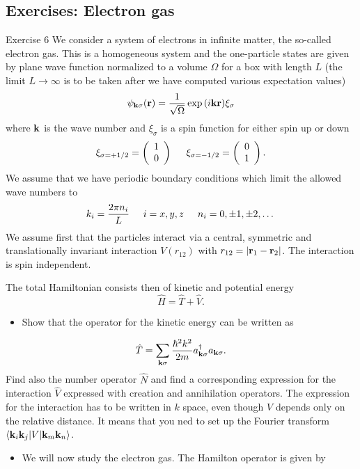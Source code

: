 \documentclass[%
twoside,                 %
final,                   %
10pt]{article}
\begin{document}
\subsection{Exercises: Electron gas}
\begin{block}{Exercise 6 }
We consider a system of electrons in infinite matter, the so-called electron gas. This is a homogeneous system and the one-particle states are given by plane wave function normalized to a volume $\Omega$ 
for a box with length $L$ (the limit $L\rightarrow \infty$ is to be taken after we have computed various expectation values)
\[
\psi_{{\bf k}\sigma}({\bf r})= \frac{1}{\sqrt{\Omega}}\exp{(i{\bf kr})}\xi_{\sigma}
\]
where ${\bf k}$ is the wave number and  $\xi_{\sigma}$ is a spin function for either spin up or down
\[ 
\xi_{\sigma=+1/2}=\left(\begin{array}{c} 1 \\ 0 \end{array}\right) \hspace{0.5cm}
\xi_{\sigma=-1/2}=\left(\begin{array}{c} 0 \\ 1 \end{array}\right).
\]
We assume that we have periodic boundary conditions which limit the allowed wave numbers to
\[
k_i=\frac{2\pi n_i}{L}\hspace{0.5cm} i=x,y,z \hspace{0.5cm} n_i=0,\pm 1,\pm 2, \dots
\]
We assume first that the particles interact via a central, symmetric and translationally invariant
interaction  $V(r_{12})$ with
$r_{12}=|{\bf r}_1-{\bf r}_2|$.  The interaction is spin independent.

The total Hamiltonian consists then of kinetic and potential energy
\[
\hat{H} = \hat{T}+\hat{V}.
\]
\begin{itemize}
 \item Show that the operator for the kinetic energy can be written as
\end{itemize}

\noindent
\[
\hat{T}=\sum_{{\bf k}\sigma}\frac{\hbar^2k^2}{2m}a_{{\bf k}\sigma}^{\dagger}a_{{\bf k}\sigma}.
\]
Find also the number operator $\hat{N}$ and find a corresponding expression for the interaction
$\hat{V}$ expressed with creation and annihilation operators.   The expression for the interaction
has to be written in  $k$ space, even though $V$ depends only on the relative distance. It means that you ned to set up the Fourier transform $\langle {\bf k}_i{\bf k}_j| V | {\bf k}_m{\bf k}_n\rangle$.
\begin{itemize}
 \item We will now study the electron gas. The Hamilton operator is given by
\end{itemize}


\end{block}
\end{document}
